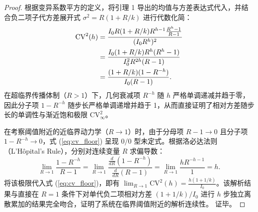 \documentclass[11pt,a4paper]{article}
\theoremstyle{plain}
\theoremstyle{definition}
\begin{document}
\begin{proof}
根据变异系数平方的定义，将引理 1 导出的均值与方差表达式代入，并结合负二项子代方差展开式 $\sigma^2 = R(1 + R/k)$ 进行代数化简：
\begin{align}
\text{CV}^2(h) &= \frac{I_0 R(1 + R/k) R^{h-1} \frac{R^h - 1}{R - 1}}{(I_0 R^h)^2} \notag \\
&= \frac{I_0 (1 + R/k) R^h (R^h - 1)}{I_0^2 R^{2h} (R - 1)} \notag \\
&= \frac{(1 + R/k)(1 - R^{-h})}{I_0(R - 1)}.
\end{align}
在超临界传播体制（$R > 1$）下，几何衰减项 $R^{-h}$ 随 $h$ 严格单调递减并趋于零，因此分子项 $1 - R^{-h}$ 随步长严格单调递增并趋于 1，从而直接证明了相对方差随步长的单调性与渐近饱和极限 $\text{CV}^2_\infty$。

在考察阈值附近的近临界动力学（$R \to 1$）时，由于分母项 $R - 1 \to 0$ 且分子项 $1 - R^{-h} \to 0$，式 (\ref{eq:cv_floor}) 呈现 $0/0$ 型未定式。根据洛必达法则（L'H\^opital's Rule），分别对连续变量 $R$ 求偏导数：
\begin{equation}
\lim_{R \to 1} \frac{1 - R^{-h}}{R - 1} = \lim_{R \to 1} \frac{\frac{d}{dR}(1 - R^{-h})}{\frac{d}{dR}(R - 1)} = \lim_{R \to 1} \frac{h R^{-h-1}}{1} = h.
\end{equation}
将该极限代入式 (\ref{eq:cv_floor})，即有 $\lim_{R \to 1} \text{CV}^2(h) = \frac{h(1 + 1/k)}{I_0}$。该解析结果与直接在 $R=1$ 条件下对单代负二项相对方差 $(1+1/k)/I_0$ 进行 $h$ 步独立离散累加的结果完全吻合，证明了系统在临界阈值附近的解析连续性。
证毕。
\end{proof}
\end{document}
